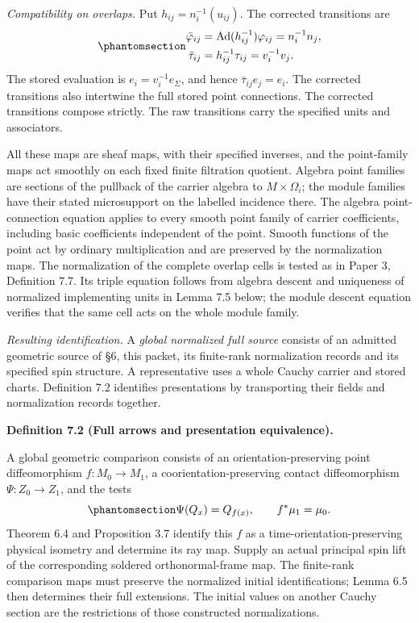 \documentclass[
  english,
  11pt,
  reqno]{amsart}
\makeatletter
\newcommand{\pandocstatementheading}[1]{%
  \par\addpenalty{\@beginparpenalty}%
  \addvspace{.5\baselineskip plus .2\baselineskip minus .2\baselineskip}%
  {\normalfont\bfseries #1\par}%
  \nobreak\@afterindenttrue\@afterheading
}
\makeatother
\begin{document}
\emph{Compatibility on overlaps.} Put \(h_{ij}=n_i^{-1}(u_{ij})\). The
corrected transitions are
\begin{equation}\protect\phantomsection\label{eq:global-corrected-stored-transitions}{
\begin{aligned}
\bar\varphi_{ij}
 &=\operatorname{Ad}(h_{ij}^{-1})\varphi_{ij}
 =n_i^{-1}n_j,\\
\bar\tau_{ij}
 &=h_{ij}^{-1}\tau_{ij}
 =v_i^{-1}v_j.
\end{aligned}
}\end{equation} The stored evaluation is \(e_i=v_i^{-1}e_\Sigma\), and
hence \(\bar\tau_{ij}e_j=e_i\). The corrected transitions also
intertwine the full stored point connections. The corrected transitions
compose strictly. The raw transitions carry the specified units and
associators.

All these maps are sheaf maps, with their specified inverses, and the
point-family maps act smoothly on each fixed finite filtration quotient.
Algebra point families are sections of the pullback of the carrier
algebra to \(M\times\Omega_i\); the module families have their stated
microsupport on the labelled incidence there. The algebra
point-connection equation applies to every smooth point family of
carrier coefficients, including basic coefficients independent of the
point. Smooth functions of the point act by ordinary multiplication and
are preserved by the normalization maps. The normalization of the
complete overlap cells is tested as in Paper 3, Definition 7.7. Its
triple equation follows from algebra descent and uniqueness of
normalized implementing units in Lemma 7.5 below; the module descent
equation verifies that the same cell acts on the whole module family.

\emph{Resulting identification.} A \emph{global normalized full source}
consists of an admitted geometric source of §6, this packet, its
finite-rank normalization records and its specified spin structure. A
representative uses a whole Cauchy carrier and stored charts. Definition
7.2 identifies presentations by transporting their fields and
normalization records together.

\pandocstatementheading{\protect{}\label{def:global-full-source-arrows}Definition 7.2 (Full arrows and presentation equivalence).}

A global geometric comparison consists of an orientation-preserving
point diffeomorphism \(f:M_0\to M_1\), a coorientation-preserving
contact diffeomorphism \(\Psi:Z_0\to Z_1\), and the tests
\begin{equation}\protect\phantomsection\label{eq:global-geometric-arrow-tests}{
\Psi(Q_x)=Q_{f(x)},\qquad f^*\mu_1=\mu_0.
}\end{equation} Theorem 6.4 and Proposition 3.7 identify this \(f\) as a
time-orientation-preserving physical isometry and determine its ray map.
Supply an actual principal spin lift of the corresponding soldered
orthonormal-frame map. The finite-rank comparison maps must preserve the
normalized initial identifications; Lemma 6.5 then determines their full
extensions. The initial values on another Cauchy section are the
restrictions of those constructed normalizations.
\end{document}
